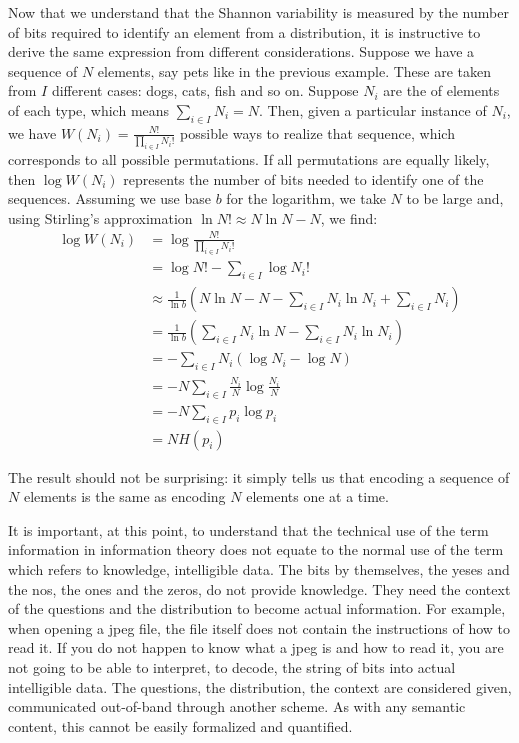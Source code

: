 \documentclass{article}
\begin{document}
Now that we understand that the Shannon variability is measured by the number of bits required to identify an element from a distribution, it is instructive to derive the same expression from different considerations. Suppose we have a sequence of $N$ elements, say pets like in the previous example. These are taken from $I$ different cases: dogs, cats, fish and so on. Suppose $N_i$ are the of elements of each type, which means $\sum_{i \in I} N_i = N$. Then, given a particular instance of $N_i$, we have $W(N_i) = \frac{N!}{\prod_{i \in I} N_i!}$ possible ways to realize that sequence, which corresponds to all possible permutations. If all permutations are equally likely, then $\log W (N_i)$ represents the number of bits needed to identify one of the sequences. Assuming we use base $b$ for the logarithm, we take $N$ to be large and, using Stirling's approximation $\ln N! \approx N \ln N - N$, we find:
\begin{equation}
\begin{aligned}
\log W(N_i) &= \log \frac{N!}{\prod_{i \in I} N_i!} \\
&= \log N! - \sum_{i \in I} \log N_i! \\
&\approx \frac{1}{\ln b} \left(N \ln N - N - \sum_{i \in I} N_i \ln N_i + \sum_{i \in I} N_i \right) \\
&= \frac{1}{\ln b} \left(\sum_{i \in I} N_i \ln N - \sum_{i \in I} N_i \ln N_i \right) \\
&= -\sum_{i \in I} N_i \left(\log N_i - \log N \right) \\
&= - N \sum_{i \in I} \frac{N_i}{N} \log \frac{N_i}{N} \\
&= - N \sum_{i \in I} p_i \log p_i \\
&= N H(p_i)
\end{aligned}
\end{equation}

The result should not be surprising: it simply tells us that encoding a sequence of $N$ elements is the same as encoding $N$ elements one at a time.

It is important, at this point, to understand that the technical use of the term information in information theory does not equate to the normal use of the term which refers to knowledge, intelligible data. The bits by themselves, the yeses and the nos, the ones and the zeros, do not provide knowledge. They need the context of the questions and the distribution to become actual information. For example, when opening a jpeg file, the file itself does not contain the instructions of how to read it. If you do not happen to know what a jpeg is and how to read it, you are not going to be able to interpret, to decode, the string of bits into actual intelligible data. The questions, the distribution, the context are considered given, communicated out-of-band through another scheme. As with any semantic content, this cannot be easily formalized and quantified.
\end{document}
